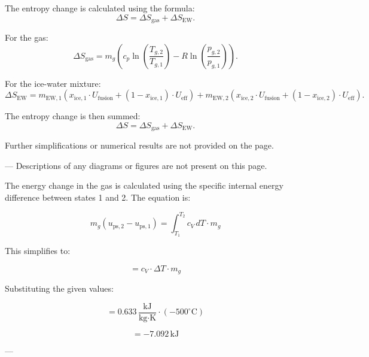 The entropy change is calculated using the formula:  
\[
\Delta S = \Delta S_{\text{gas}} + \Delta S_{\text{EW}}.
\]  

For the gas:  
\[
\Delta S_{\text{gas}} = m_g \left( c_p \ln\left(\frac{T_{g,2}}{T_{g,1}}\right) - R \ln\left(\frac{p_{g,2}}{p_{g,1}}\right) \right).
\]  

For the ice-water mixture:  
\[
\Delta S_{\text{EW}} = m_{\text{EW},1} \left( x_{\text{ice},1} \cdot U_{\text{fusion}} + (1 - x_{\text{ice},1}) \cdot U_{\text{eff}} \right)  
+ m_{\text{EW},2} \left( x_{\text{ice},2} \cdot U_{\text{fusion}} + (1 - x_{\text{ice},2}) \cdot U_{\text{eff}} \right).
\]  

The entropy change is then summed:  
\[
\Delta S = \Delta S_{\text{gas}} + \Delta S_{\text{EW}}.
\]  

Further simplifications or numerical results are not provided on the page.  

---  
Descriptions of any diagrams or figures are not present on this page.

The energy change in the gas is calculated using the specific internal energy difference between states 1 and 2. The equation is:  

\[
m_g \left( u_{\text{ps},2} - u_{\text{ps},1} \right) = \int_{T_1}^{T_2} c_V \, dT \cdot m_g
\]

This simplifies to:  

\[
= c_V \cdot \Delta T \cdot m_g
\]

Substituting the given values:  

\[
= 0.633 \, \frac{\text{kJ}}{\text{kg·K}} \cdot (-500^\circ\text{C})
\]

\[
= -7.092 \, \text{kJ}
\]

---